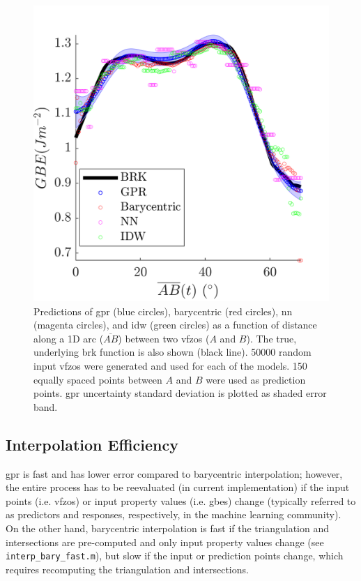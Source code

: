\documentclass[final,twocolumn,12pt]{elsarticle}
\newcommand{\inpt}{input}
\newcommand{\outpt}{prediction}
\begin{document}
{\begin{figure}
    \centering
    \includegraphics{figures/tunnel-50000.png}
    \caption{Predictions of \gls{gpr} (blue circles), barycentric (red circles), \gls{nn} (magenta circles), and \gls{idw} (green circles) as a function of distance along a 1D arc ($\overline{AB}$) between two \glspl{vfzo} ($A$ and $B$). The true, underlying \gls{brk} function is also shown (black line). \num{50000} random \inpt{} \glspl{vfzo} were generated and used for each of the models. \num{150} equally spaced points between $A$ and $B$ were used as \outpt{} points. \gls{gpr} uncertainty standard deviation is plotted as shaded error band.}
    \label{fig:tunnel-50000}
\end{figure}

\subsection{Interpolation Efficiency}
\label{sec:results:efficiency}


\Gls{gpr} is fast and has lower error compared to barycentric interpolation; however, the entire process has to be reevaluated (in current implementation) if the input points (i.e. \glspl{vfzo}) or input property values (i.e. \glspl{gbe}) change
(typically referred to as predictors and responses, respectively, in the machine learning community).
On the other hand, barycentric interpolation is fast if the triangulation and intersections are pre-computed and only input property values change (see \texttt{interp\_bary\_fast.m}), but slow if the \inpt{} or \outpt{} points change, which requires recomputing the triangulation and intersections.

}
\end{document}
